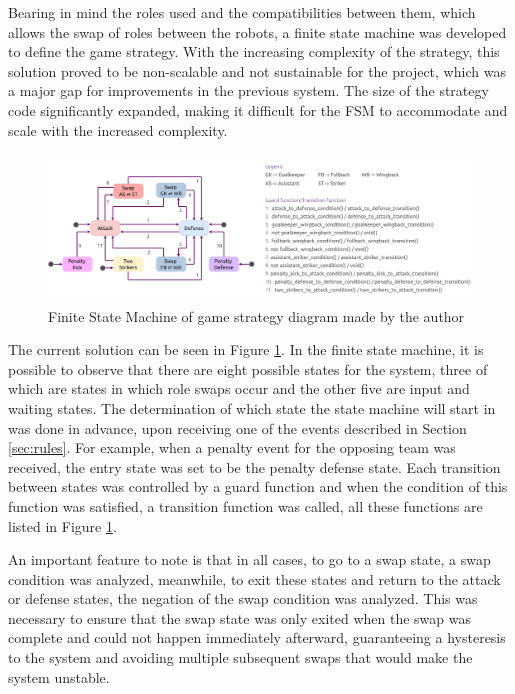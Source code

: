 Bearing in mind the roles used and the compatibilities between them, which allows the swap of roles between the robots, a finite state machine was developed to define the game strategy. With the increasing complexity of the strategy, this solution proved to be non-scalable and not sustainable for the project, which was a major gap for improvements in the previous system. The size of the strategy code significantly expanded, making it difficult for the FSM to accommodate and scale with the increased complexity.

\begin{figure}[!h]
    \centering
    \includegraphics[width=\linewidth]{images/BehaviorsController FSM.png}
    \caption{Finite State Machine of game strategy diagram made by the author}
    \label{fig:behaviors_controller_fsm}
\end{figure}

The current solution can be seen in Figure \ref{fig:behaviors_controller_fsm}. In the finite state machine, it is possible to observe that there are eight possible states for the system, three of which are states in which role swaps occur and the other five are input and waiting states. The determination of which state the state machine will start in was done in advance, upon receiving one of the events described in Section \ref{sec:rules}. For example, when a penalty event for the opposing team was received, the entry state was set to be the penalty defense state. Each transition between states was controlled by a guard function and when the condition of this function was satisfied, a transition function was called, all these functions are listed in Figure \ref{fig:behaviors_controller_fsm}.

An important feature to note is that in all cases, to go to a swap state, a swap condition was analyzed, meanwhile, to exit these states and return to the attack or defense states, the negation of the swap condition was analyzed. This was necessary to ensure that the swap state was only exited when the swap was complete and could not happen immediately afterward, guaranteeing a hysteresis to the system and avoiding multiple subsequent swaps that would make the system unstable.
